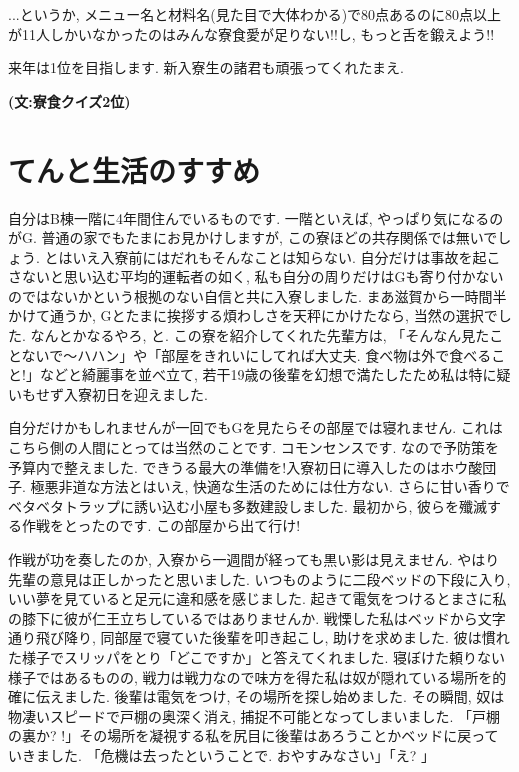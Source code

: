 \documentclass[10pt,b5jsbook,dvips,dvipdfmx,openany]{jsbook}
\theoremstyle{definition}
\begin{document}
		...というか, メニュー名と材料名(見た目で大体わかる)で80点あるのに80点以上が11人しかいなかったのはみんな寮食愛が足りない!!し, もっと舌を鍛えよう!!

		来年は1位を目指します. 新入寮生の諸君も頑張ってくれたまえ.

{\bf (文:寮食クイズ2位)}

    \section{てんと生活のすすめ}

    自分はB棟一階に4年間住んでいるものです. 一階といえば, やっぱり気になるのがG.
    普通の家でもたまにお見かけしますが, この寮ほどの共存関係では無いでしょう.
    とはいえ入寮前にはだれもそんなことは知らない.
    自分だけは事故を起こさないと思い込む平均的運転者の如く, 私も自分の周りだけはGも寄り付かないのではないかという根拠のない自信と共に入寮しました. まあ滋賀から一時間半かけて通うか, Gとたまに挨拶する煩わしさを天秤にかけたなら, 当然の選択でした. なんとかなるやろ, と.
    この寮を紹介してくれた先輩方は, 「そんなん見たことないで〜ハハン」や「部屋をきれいにしてれば大丈夫. 食べ物は外で食べること!」などと綺麗事を並べ立て, 若干19歳の後輩を幻想で満たしたため私は特に疑いもせず入寮初日を迎えました.

    自分だけかもしれませんが一回でもGを見たらその部屋では寝れません. これはこちら側の人間にとっては当然のことです. コモンセンスです. なので予防策を予算内で整えました. できうる最大の準備を!入寮初日に導入したのはホウ酸団子. 極悪非道な方法とはいえ, 快適な生活のためには仕方ない. さらに甘い香りでベタベタトラップに誘い込む小屋も多数建設しました. 最初から, 彼らを殲滅する作戦をとったのです. この部屋から出て行け!

    作戦が功を奏したのか, 入寮から一週間が経っても黒い影は見えません. やはり先輩の意見は正しかったと思いました. いつものように二段ベッドの下段に入り, いい夢を見ていると足元に違和感を感じました. 起きて電気をつけるとまさに私の膝下に彼が仁王立ちしているではありませんか. 戦慄した私はベッドから文字通り飛び降り, 同部屋で寝ていた後輩を叩き起こし, 助けを求めました. 彼は慣れた様子でスリッパをとり「どこですか」と答えてくれました. 寝ぼけた頼りない様子ではあるものの, 戦力は戦力なので味方を得た私は奴が隠れている場所を的確に伝えました. 後輩は電気をつけ, その場所を探し始めました. その瞬間, 奴は物凄いスピードで戸棚の奥深く消え, 捕捉不可能となってしまいました. 「戸棚の裏か? !」その場所を凝視する私を尻目に後輩はあろうことかベッドに戻っていきました. 「危機は去ったということで. おやすみなさい」「え? 」
\end{document}
